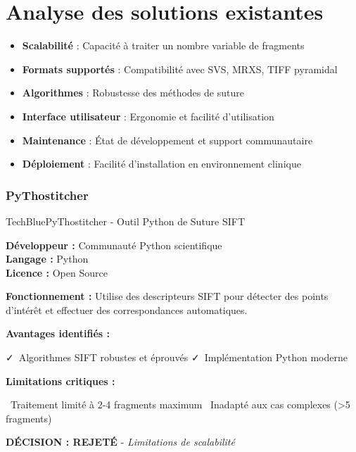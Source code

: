 \documentclass[12pt,a4paper]{report}
\newcommand{\pro}[1]{\textcolor{SuccessGreen}{\faCheck\ #1}}
\newcommand{\con}[1]{\textcolor{DangerRed}{\faTimes\ #1}}
\begin{document}
\section{Analyse des solutions existantes}

\begin{tcolorbox}[colback=TechBlue!10, colframe=TechBlue, title=Critères d'Évaluation]
\begin{itemize}[leftmargin=*]
    \item \textbf{Scalabilité} : Capacité à traiter un nombre variable de fragments
    \item \textbf{Formats supportés} : Compatibilité avec SVS, MRXS, TIFF pyramidal
    \item \textbf{Algorithmes} : Robustesse des méthodes de suture
    \item \textbf{Interface utilisateur} : Ergonomie et facilité d'utilisation
    \item \textbf{Maintenance} : État de développement et support communautaire
    \item \textbf{Déploiement} : Facilité d'installation en environnement clinique
\end{itemize}
\end{tcolorbox}

\subsubsection{PyThostitcher}

\begin{techbox}{TechBlue}{PyThostitcher - Outil Python de Suture SIFT}

\textbf{Développeur :} Communauté Python scientifique \\
\textbf{Langage :} Python \\
\textbf{Licence :} Open Source

\textbf{Fonctionnement :} Utilise des descripteurs SIFT pour détecter des points d'intérêt et effectuer des correspondances automatiques.

\textbf{Avantages identifiés :}
\begin{itemize}[leftmargin=*]
    \pro{Algorithmes SIFT robustes et éprouvés}
    \pro{Implémentation Python moderne}
\end{itemize}

\textbf{Limitations critiques :}
\begin{itemize}[leftmargin=*]
    \con{Traitement limité à 2-4 fragments maximum}
    \con{Inadapté aux cas complexes (>5 fragments)}
\end{itemize}

\begin{center}
\textbf{\textcolor{DangerRed}{DÉCISION : REJETÉ}} - \textit{Limitations de scalabilité}
\end{center}

\end{techbox}
\end{document}
